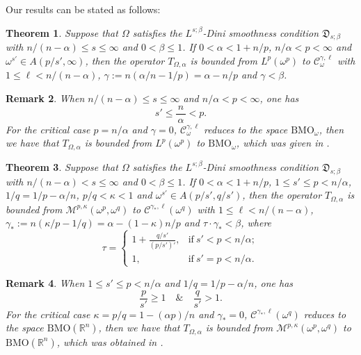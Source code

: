 \documentclass[preprint,10pt]{elsarticle}
\newtheorem{thm}{Theorem}[section]
\newtheorem{rem}[thm]{Remark}
\numberwithin{equation}{section}
\begin{document}
Our results can be stated as follows:
\begin{thm}\label{thm1}
Suppose that $\Omega$ satisfies the $L^{s;\beta}$-Dini smoothness condition $\mathfrak{D}_{s;\beta}$ with $n/{(n-\alpha)}\leq s\leq\infty$ and $0<\beta\leq1$. If $0<\alpha<1+n/p$, $n/{\alpha}<p<\infty$ and $\omega^{s'}\in A(p/{s'},\infty)$, then the operator $T_{\Omega,\alpha}$ is bounded from $L^{p}(\omega^p)$ to $\mathcal{C}^{\gamma,\ell}_{\omega}$ with $1\leq\ell<n/{(n-\alpha)}$, $\gamma:=n(\alpha/n-1/p)=\alpha-n/p$ and $\gamma<\beta$.
\end{thm}

\begin{rem}
When $n/{(n-\alpha)}\leq s\leq\infty$ and $n/{\alpha}<p<\infty$, one has
\begin{equation*}
s'\leq\frac{\,n\,}{\alpha}<p.
\end{equation*}
For the critical case $p=n/{\alpha}$ and $\gamma=0$, $\mathcal{C}^{\gamma,\ell}_{\omega}$ reduces to the space $\mathrm{BMO}_{\omega}$, then we have that $T_{\Omega,\alpha}$ is bounded from $L^{p}(\omega^p)$ to $\mathrm{BMO}_{\omega}$, which was given in \cite{ding2}.
\end{rem}

\begin{thm}\label{thm2}
Suppose that $\Omega$ satisfies the $L^{s;\beta}$-Dini smoothness condition $\mathfrak{D}_{s;\beta}$ with $n/{(n-\alpha)}<s\le\infty$ and $0<\beta\leq1$. If $0<\alpha<1+n/p$, $1\le s'\leq p<n/{\alpha}$, $1/q=1/p-{\alpha}/n$, $p/q<\kappa<1$ and $\omega^{s'}\in A(p/{s'},q/{s'})$, then the operator $T_{\Omega,\alpha}$ is bounded from $\mathcal{M}^{p,\kappa}(\omega^p,\omega^q)$ to $\mathcal{C}^{\gamma_*,\ell}(\omega^q)$ with $1\leq\ell<n/{(n-\alpha)}$, $\gamma_*:=n(\kappa/p-1/q)=\alpha-{(1-\kappa)n}/p$ and $\tau\cdot\gamma_*<\beta$, where
\begin{equation*}
\tau=
\begin{cases}
1+\frac{q/{s'}}{(p/{s'})'}, &\mbox{if}~ s'<p<n/{\alpha};\\
1,&\mbox{if}~ s'=p<n/{\alpha}.
\end{cases}
\end{equation*}
\end{thm}

\begin{rem}
When $1\le s'\leq p<n/{\alpha}$ and $1/q=1/p-{\alpha}/n$, one has
\begin{equation*}
\frac{p}{s'}\geq1 \quad \& \quad \frac{q}{s'}>1.
\end{equation*}
For the critical case $\kappa=p/q=1-{(\alpha p)}/n$ and $\gamma_*=0$, $\mathcal{C}^{\gamma_*,\ell}(\omega^q)$ reduces to the space $\mathrm{BMO}(\mathbb R^n)$, then we have that $T_{\Omega,\alpha}$ is bounded from $\mathcal{M}^{p,\kappa}(\omega^p,\omega^q)$ to $\mathrm{BMO}(\mathbb R^n)$, which was obtained in \cite{wang2}.
\end{rem}
\end{document}
